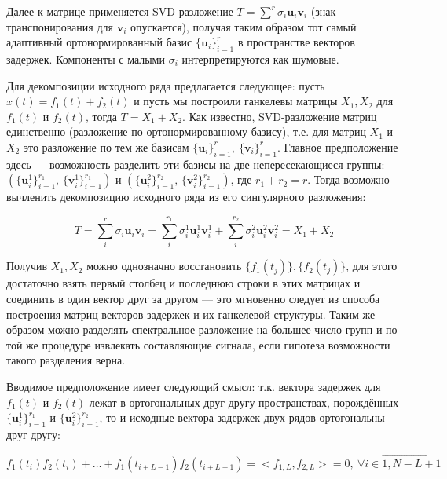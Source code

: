 	    	Далее к матрице применяется SVD-разложение $ T = \sum\limits^{r} \sigma_i \mathbf{u}_i \mathbf{v}_i $ (знак транспонирования для $ \mathbf{v}_i $ опускается), получая таким образом тот самый адаптивный ортонормированный базис $ \{\mathbf{u}_i\}_{i=1}^r $ в пространстве векторов задержек. Компоненты с малыми $ \sigma_i $ интерпретируются как шумовые.
	    	
	    	Для декомпозиции исходного ряда предлагается следующее: пусть $ x(t) = f_1(t) + f_2(t) $ и пусть мы построили ганкелевы матрицы $ X_1, X_2 $ для $ f_1(t) $ и $ f_2(t) $, тогда $ T = X_1 + X_2 $. Как известно, SVD-разложение матриц единственно (разложение по ортонормированному базису), т.е. для матриц $ X_1 $ и $ X_2 $ это разложение по тем же базисам $ \{\mathbf{u}_i\}_{i=1}^r, \  \{\mathbf{v}_i\}_{i=1}^r $. Главное предположение здесь --- возможность разделить эти базисы на две \underline{непересекающиеся} группы:  $ ( \{\mathbf{u}^1_i\}_{i=1}^{r_1}, \, \{\mathbf{v}^1_i\}_{i=1}^{r_1} ) $ и $ ( \{\mathbf{u}^2_i\}_{i=1}^{r_2}, \, \{\mathbf{v}^2_i\}_{i=1}^{r_2} ) $, где $ r_1 + r_2 = r $. Тогда возможно вычленить декомпозицию исходного ряда из его сингулярного разложения:
	    	
	    	\begin{equation*}
	    		 T = \sum\limits_i^{r} \sigma_i \mathbf{u}_i \mathbf{v}_i = \sum\limits_i^{r_1} \sigma_i^1 \mathbf{u}_i^1 \mathbf{v}_i^1 + \sum\limits_i^{r_2} \sigma_i^2 \mathbf{u}_i^2 \mathbf{v}_i^2 = X_1 + X_2
	    	\end{equation*}
	    	
	    	Получив $ X_1, X_2 $ можно однозначно восстановить $ \{f_1(t_j)\}, \{f_2(t_j)\} $, для этого достаточно взять первый столбец и последнюю строки в этих матрицах и соединить в один вектор друг за другом --- это мгновенно следует из способа построения матриц векторов задержек и их ганкелевой структуры. Таким же образом можно разделять спектральное разложение на большее число групп и по той же процедуре извлекать составляющие сигнала, если гипотеза возможности такого разделения верна.
	    	
	    	Вводимое предположение имеет следующий смысл: т.к. вектора задержек для $ f_1(t) $ и $ f_2(t) $ лежат в ортогональных друг другу пространствах, порождённых $ \{\mathbf{u}^1_i\}_{i=1}^{r_1} $ и $ \{\mathbf{u}^2_i\}_{i=1}^{r_2} $, то и исходные вектора задержек двух рядов ортогональны друг другу:
	    	
	    	\[
	    		 f_1(t_i) f_2(t_i) + \ldots + f_1(t_{i + L - 1}) f_2(t_{i + L - 1}) = <f_{1, L}, f_{2, L}> = 0, \  \forall i \in \overrightarrow{1, N - L + 1}
	    	\]
	    	
